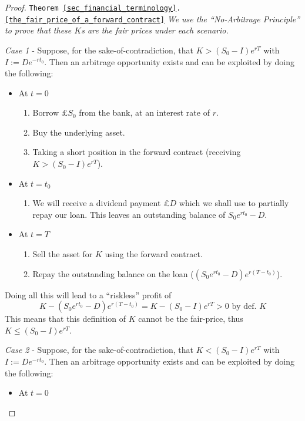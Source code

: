 \documentclass[11pt,a4paper]{article}
\begin{document}
  \begin{proof}{\texttt{Theorem \ref{sec_financial_terminology}.\ref{the_fair_price_of_a_forward_contract}}}
    \textit{We use the ``No-Arbitrage Principle'' to prove that these $K$s are the fair prices under each scenario.}
    \par \textit{Case 1} - Suppose, for the sake-of-contradiction, that $K>(S_0-I)e^{rT}$ with $I:=De^{-rt_0}$. Then an arbitrage opportunity exists and can be exploited by doing the following:
    \begin{itemize}
      \item At $t=0$
      \begin{enumerate}
        \item Borrow £$S_0$ from the bank, at an interest rate of $r$.
        \item Buy the underlying asset.
        \item Taking a short position in the forward contract (receiving $K>(S_0-I)e^{rT}$).
      \end{enumerate}
      \item At $t=t_0$
      \begin{enumerate}
        \item We will receive a dividend payment £$D$ which we shall use to partially repay our loan. This leaves an outstanding balance of $S_0e^{rt_0}-D$.
      \end{enumerate}
      \item At $t=T$
      \begin{enumerate}
        \item Sell the asset for $K$ using the forward contract.
        \item Repay the outstanding balance on the loan ($(S_0e^{rt_0}-D)e^{r(T-t_0)}$).
      \end{enumerate}
    \end{itemize}
    \par Doing all this will lead to a ``riskless'' profit of
    \[ K-(S_0e^{rt_0}-D)e^{r(T-t_0)}=K-(S_0-I)e^{rT}>0\text{ by def. }K \]
    This means that this definition of $K$ cannot be the fair-price, thus $K\leq(S_0-I)e^{rT}$.
    \par \textit{Case 2} - Suppose, for the sake-of-contradiction, that $K<(S_0-I)e^{rT}$ with $I:=De^{-rt_0}$. Then an arbitrage opportunity exists and can be exploited by doing the following:
    \begin{itemize}
      \item At $t=0$
      \begin{enumerate}

\end{enumerate}
\end{itemize}
\end{proof}
\end{document}
